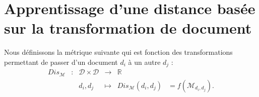 



\section{Apprentissage d'une distance basée sur la transformation de document}
Nous définissons la métrique suivante qui est fonction des transformations permettant de passer d'un document $d_i$ à un autre $d_j$ :
\begin{equation}
\begin{array}{cccccc}
Dis_\mathcal{M} & : & \mathcal{D} \times \mathcal{D} & \to & \mathbb{R} & \\
& & d_i, d_j & \mapsto & Dis_{\mathcal{M}}(d_i, d_j) & = f(\mathcal{M}_{d_i, d_j}). \\
\end{array} \label{eq:similarite:distance-modif}
\end{equation}

